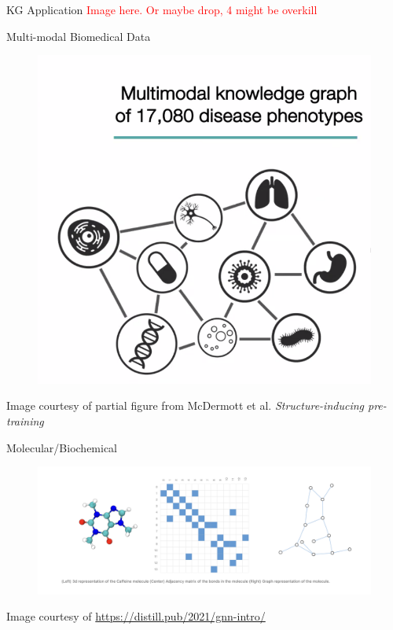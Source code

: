 \documentclass{beamer}
\begin{document}
\begin{frame}{KG Application}
    \textcolor{red}{Image here. Or maybe drop, 4 might be overkill}
\end{frame}

\begin{frame}{Multi-modal Biomedical Data}
    \begin{figure}
        \centering 
        \includegraphics[scale=0.2]{MultimodalPreview.png}
    \end{figure}
    Image courtesy of partial figure from McDermott et al. {\it Structure-inducing pre-training} \cite{mcdermott_structure-inducing_2023}
\end{frame}


\begin{frame}{Molecular/Biochemical }
    \begin{figure}
        \centering
        \includegraphics[scale=0.3]{Caffeine_Graph.png}
    \end{figure}
    Image courtesy of \url{https://distill.pub/2021/gnn-intro/} \cite{sanchez-lengeling_gentle_2021}
\end{frame}
\end{document}
